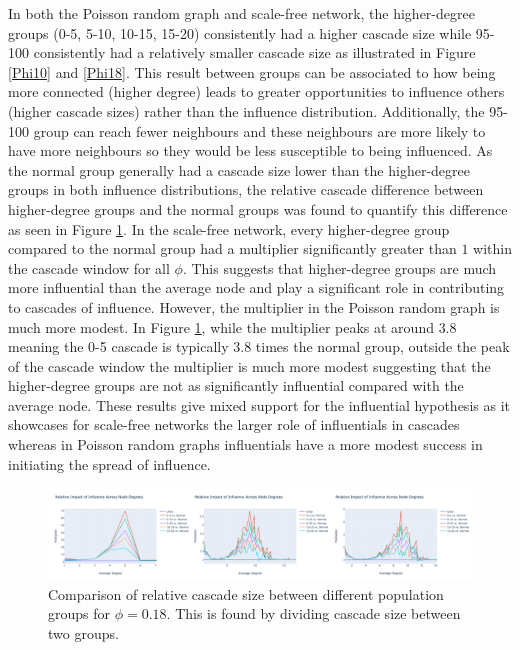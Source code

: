 \documentclass[10pt, oneside, reqno]{amsart}
\theoremstyle{plain}%
\theoremstyle{definition}
\theoremstyle{remark}
\begin{document}
In both the Poisson random graph and scale-free network, the higher-degree groups (0-5, 5-10, 10-15, 15-20) consistently had a higher cascade size while 95-100 consistently had a relatively smaller cascade size as illustrated in Figure \ref{Phi10} and \ref{Phi18}.
This result between groups can be associated to how being more connected (higher degree) leads to greater opportunities to influence others (higher cascade sizes) rather than the influence distribution.
Additionally, the 95-100 group can reach fewer neighbours and these neighbours are more likely to have more neighbours so they would be less susceptible to being influenced.
As the normal group generally had a cascade size lower than the higher-degree groups in both influence distributions, the relative cascade difference between higher-degree groups and the normal groups was found to quantify this difference as seen in Figure \ref{Mult18}.
In the scale-free network, every higher-degree group compared to the normal group had a multiplier significantly greater than $1$ within the cascade window for all $\phi$.
This suggests that higher-degree groups are much more influential than the average node and play a significant role in contributing to cascades of influence.
However, the multiplier in the Poisson random graph is much more modest. In Figure \ref{Mult18}, while the multiplier peaks at around $3.8$ meaning the 0-5 cascade is typically $3.8$ times the normal group, outside the peak of the cascade window the multiplier is much more modest suggesting that the higher-degree groups are not as significantly influential compared with the average node.
These results give mixed support for the influential hypothesis as it showcases for scale-free networks the larger role of influentials in cascades whereas in Poisson random graphs influentials have a more modest success in initiating the spread of influence.

\begin{figure}[ht]
    \includegraphics[scale=0.2]{Report/figs/Multiplier18.png}
    \caption{Comparison of relative cascade size between different population groups for $\phi = 0.18$. This is found by dividing cascade size between two groups. }
    \label{Mult18}
\end{figure}
\end{document}
